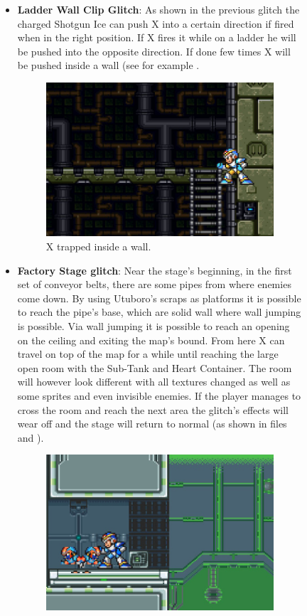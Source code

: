 \begin{figure}[htp]
\begin{itemize}
	\item \textbf{Ladder Wall Clip Glitch}: As shown in the previous glitch the charged Shotgun Ice can push X into a certain direction if fired when in the right position. If X fires it while on a ladder he will be pushed into the opposite direction. If done few times X will be pushed inside a wall (see for example .
	\begin{figure}[htp]
		\centering
		\includegraphics[width=0.5\linewidth]{figures/X1/Miscs/Wall_clipping.jpg}
		\caption{X trapped inside a wall.}
	\end{figure}
	\item \textbf{Factory Stage glitch}: Near the stage's beginning,  in the first set of conveyor belts, there are some pipes from where enemies come down. By using Utuboro's scraps as platforms it is possible to reach the pipe's base, which are solid wall where wall jumping is possible. Via wall jumping it is possible to reach an opening on the ceiling and exiting the map's bound. From here X can travel on top of the map for a while until reaching the large open room with the Sub-Tank and Heart Container. The room will however look different with all textures changed as well as some sprites and even invisible enemies. If the player manages to cross the room and reach the next area the glitch's effects will wear off and the stage will return to normal (as shown in files  and ).
	\begin{figure}[htp]
		\centering
		\includegraphics[width=0.5\linewidth]{figures/X1/Miscs/Factory_glitch_heart.jpg}

\end{figure}
\end{itemize}
\end{figure}
